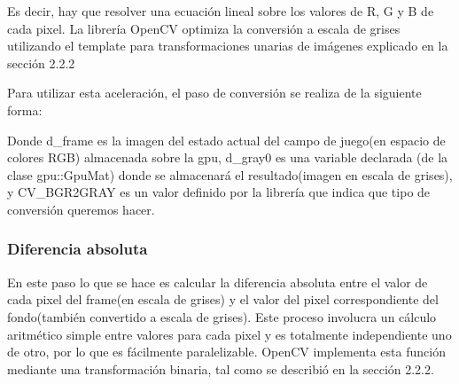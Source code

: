 \documentclass[a4paper,10pt]{report}
\begin{document}
\indent Es decir, hay que resolver una ecuación lineal sobre los valores de R, G y B de cada pixel. 
La librería OpenCV optimiza la conversión a escala de grises utilizando el template para transformaciones unarias de imágenes explicado en la sección 2.2.2
 
Para utilizar esta aceleración, el paso de conversión se realiza de la siguiente forma:

 \begin{center}
\end{center}


Donde d\_frame es la imagen del estado actual del campo de juego(en espacio de colores RGB) almacenada sobre la gpu, d\_gray0 es una variable declarada (de la clase gpu::GpuMat) donde se almacenará el resultado(imagen en escala de grises),
y CV\_BGR2GRAY es un valor definido por la librería que indica que tipo de conversión queremos hacer.


 

 \subsubsection{Diferencia absoluta}
 En este paso lo que se hace es calcular la diferencia absoluta entre el valor de cada pixel del frame(en escala de grises) y el valor del pixel correspondiente del fondo(también convertido a escala de grises). 
 Este proceso involucra un cálculo aritmético simple entre valores para cada pixel y es totalmente independiente uno de otro, por lo que es fácilmente paralelizable. 
OpenCV implementa esta función mediante una transformación binaria, tal como se describió en la sección 2.2.2.
\end{document}
